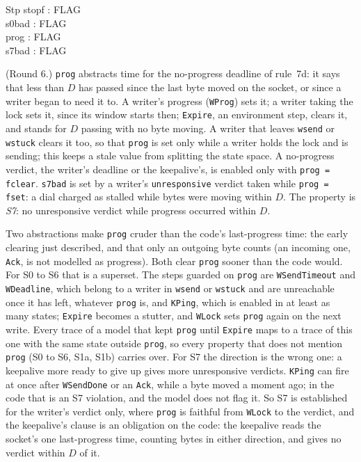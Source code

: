 \documentclass[a4paper,10pt,fleqn]{article}
\begin{document}
\begin{schema}{Stp}
  stopf : FLAG \\
  s0bad : FLAG \\
  prog : FLAG \\
  s7bad : FLAG
\end{schema}

(Round 6.)  \texttt{prog} abstracts time for the no-progress deadline of
rule~7d: it says that less than $D$ has passed since the last byte moved on the
socket, or since a writer began to need it to.  A writer's progress
(\texttt{WProg}) sets it; a writer taking the lock sets it, since its window
starts then; \texttt{Expire}, an environment step, clears it, and stands for $D$
passing with no byte moving.  A writer that leaves \texttt{wsend} or
\texttt{wstuck} clears it too, so that \texttt{prog} is set only while a writer
holds the lock and is sending; this keeps a stale value from splitting the state
space.  A no-progress verdict, the writer's deadline or the keepalive's, is
enabled only with \texttt{prog = fclear}.  \texttt{s7bad} is set by a writer's
\texttt{unresponsive} verdict taken while \texttt{prog = fset}: a dial charged
as stalled while bytes were moving within $D$.  The property is \emph{S7}: no
unresponsive verdict while progress occurred within $D$.

Two abstractions make \texttt{prog} cruder than the code's last-progress time:
the early clearing just described, and that only an outgoing byte counts (an
incoming one, \texttt{Ack}, is not modelled as progress).  Both clear
\texttt{prog} sooner than the code would.  For S0 to S6 that is a superset.
The steps guarded on \texttt{prog} are \texttt{WSendTimeout} and
\texttt{WDeadline}, which belong to a writer in \texttt{wsend} or
\texttt{wstuck} and are unreachable once it has left, whatever \texttt{prog}
is, and \texttt{KPing}, which is enabled in at least as many states;
\texttt{Expire} becomes a stutter, and \texttt{WLock} sets \texttt{prog} again
on the next write.  Every trace of a model that kept \texttt{prog} until
\texttt{Expire} maps to a trace of this one with the same state outside
\texttt{prog}, so every property that does not mention \texttt{prog} (S0 to S6,
S1a, S1b) carries over.  For S7 the direction is the wrong one: a keepalive
more ready to give up gives more unresponsive verdicts.  \texttt{KPing} can fire
at once after \texttt{WSendDone} or an \texttt{Ack}, while a byte moved a moment
ago; in the code that is an S7 violation, and the model does not flag it.  So
S7 is established for the writer's verdict only, where \texttt{prog} is faithful
from \texttt{WLock} to the verdict, and the keepalive's clause is an obligation
on the code: the keepalive reads the socket's one last-progress time, counting
bytes in either direction, and gives no verdict within $D$ of it.
\end{document}
